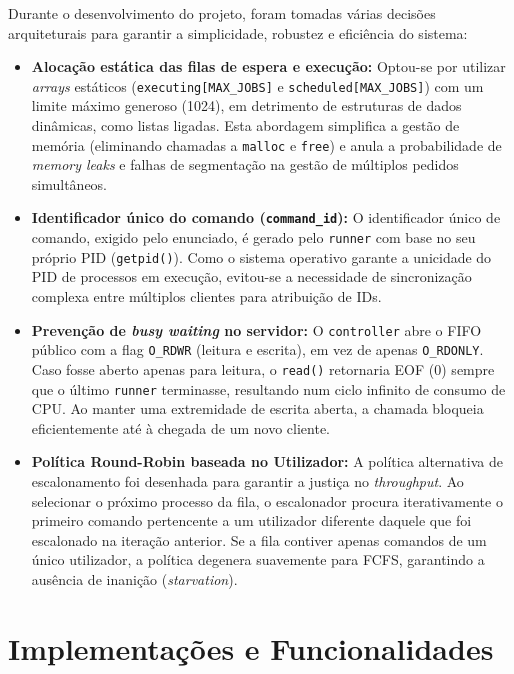 \documentclass[runningheads,11pt]{llncs}
\begin{document}
        Durante o desenvolvimento do projeto, foram tomadas várias decisões arquiteturais para garantir a simplicidade, robustez e eficiência do sistema:

        \begin{itemize}
                \item \textbf{Alocação estática das filas de espera e execução:} Optou-se por utilizar \textit{arrays} estáticos (\texttt{executing[MAX\_JOBS]} e \texttt{scheduled[MAX\_JOBS]}) com um limite máximo generoso (1024), em detrimento de estruturas de dados dinâmicas, como listas ligadas. Esta abordagem simplifica a gestão de memória (eliminando chamadas a \texttt{malloc} e \texttt{free}) e anula a probabilidade de \textit{memory leaks} e falhas de segmentação na gestão de múltiplos pedidos simultâneos.
                \item \textbf{Identificador único do comando (\texttt{command\_id}):} O identificador único de comando, exigido pelo enunciado, é gerado pelo \texttt{runner} com base no seu próprio PID (\texttt{getpid()}). Como o sistema operativo garante a unicidade do PID de processos em execução, evitou-se a necessidade de sincronização complexa entre múltiplos clientes para atribuição de IDs.
                \item \textbf{Prevenção de \textit{busy waiting} no servidor:} O \texttt{controller} abre o FIFO público com a flag \texttt{O\_RDWR} (leitura e escrita), em vez de apenas \texttt{O\_RDONLY}. Caso fosse aberto apenas para leitura, o \texttt{read()} retornaria EOF (0) sempre que o último \texttt{runner} terminasse, resultando num ciclo infinito de consumo de CPU. Ao manter uma extremidade de escrita aberta, a chamada bloqueia eficientemente até à chegada de um novo cliente.
                \item \textbf{Política Round-Robin baseada no Utilizador:} A política alternativa de escalonamento foi desenhada para garantir a justiça no \textit{throughput}. Ao selecionar o próximo processo da fila, o escalonador procura iterativamente o primeiro comando pertencente a um utilizador diferente daquele que foi escalonado na iteração anterior. Se a fila contiver apenas comandos de um único utilizador, a política degenera suavemente para FCFS, garantindo a ausência de inanição (\textit{starvation}).
        \end{itemize}

        \newpage

        \section{Implementações e Funcionalidades}
\end{document}
